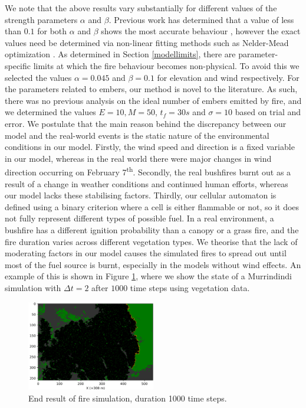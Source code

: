 \noindent We note that the above results vary substantially for different values of the strength parameters $\alpha$ and $\beta$. Previous work has determined that a value of less than $0.1$ for both $\alpha$ and $\beta$ shows the most accurate behaviour \cite{Aleksandridis_2008}, however the exact values need be determined via non-linear fitting methods such as Nelder-Mead optimization \cite{Denham_2018}. As determined in Section \ref{modellimits}, there are parameter-specific limits at which the fire behaviour becomes non-physical. To avoid this we selected the values $\alpha = 0.045$ and $\beta = 0.1$ for elevation and wind respectively. \newline
\noindent For the parameters related to embers, our method is novel to the literature. As such, there was no previous analysis on the ideal number of embers emitted by fire, and we determined the values $E=10, M=50$, $t_f = 30s$ and $\sigma=10$ based on trial and error.\newline \indent
We postulate that the main reason behind the discrepancy between our model and the real-world events is the static nature of the environmental conditions in our model. Firstly, the wind speed and direction is a fixed variable in our model, whereas in the real world there were major changes in wind direction occurring on February 7\textsuperscript{th}. Secondly, the real bushfires burnt out as a result of a change in weather conditions and continued human efforts, whereas our model lacks these stabilising factors. Thirdly, our cellular automaton is defined using a binary criterion where a cell is either flammable or not, so it does not fully represent different types of possible fuel. In a real environment, a bushfire has a different ignition probability than a canopy or a grass fire, and the fire duration varies across different vegetation types. \newline\indent
We theorise that the lack of moderating factors in our model causes the simulated fires to spread out until most of the fuel source is burnt, especially in the models without wind effects. An example of this is shown in Figure \ref{fig:endFrame}, where we show the state of a Murrindindi simulation with $\Delta t=2$ after $1000$ time steps using vegetation data.

\begin{figure}[h!]
    \centering
    \includegraphics[width=0.5\textwidth]{Figures/LastFrame.png}
    \caption{End result of fire simulation, duration 1000 time steps.}
    \label{fig:endFrame}
\end{figure}


